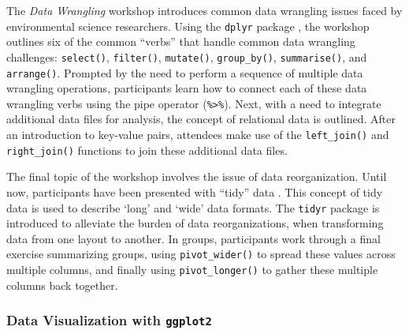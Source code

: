 \documentclass[12pt]{article}
\begin{document}
\noindent The \emph{Data Wrangling} workshop introduces common data wrangling
issues faced by environmental science researchers. Using the \texttt{dplyr} 
package \citep{dplyr}, the workshop outlines six of the common ``verbs'' that
handle common data wrangling challenges: \texttt{select()}, \texttt{filter()},
\texttt{mutate()}, \texttt{group\_by()}, \texttt{summarise()}, and
\texttt{arrange()}. Prompted by the need to perform a sequence of multiple data
wrangling operations, participants learn how to connect each of these
data wrangling verbs using the pipe operator (\texttt{\%>\%}). Next, with a 
need to integrate additional data files for analysis, the concept of relational
data is outlined. After an introduction to key-value pairs, attendees
make use of the \texttt{left\_join()} and \texttt{right\_join()} functions to
join these additional data files. 

\quad The final topic of the workshop involves the issue of data reorganization.
Until now, participants have been presented with ``tidy'' data \citep{tidy}. 
This concept of tidy data is used to describe `long' and `wide' data
formats. The \texttt{tidyr} package \citep{tidyr} is introduced to alleviate the
burden of data reorganizations, when transforming data from one layout to another. In
groups, participants work through a final exercise summarizing groups, using 
\texttt{pivot\_wider()} to spread these values across multiple columns, and
finally using \texttt{pivot\_longer()} to gather these multiple columns back 
together. 

\subsubsection{Data Visualization with \texttt{ggplot2}}
\label{sec:vizual} 
\end{document}
